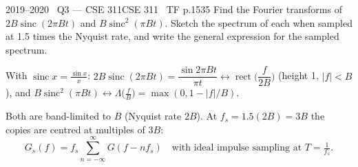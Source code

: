 \begin{qcard}{2019--2020 \textbullet\ Q3 --- CSE 311}{CSE 311 \textbullet\ TF p.15}{35}
Find the Fourier transforms of $2B\operatorname{sinc}(2\pi Bt)$ and $B\operatorname{sinc}^2(\pi Bt)$. Sketch the spectrum of each when sampled at 1.5 times the Nyquist rate, and write the general expression for the sampled spectrum.
\end{qcard}
\begin{solution}
With $\operatorname{sinc}x=\frac{\sin x}x$: $2B\operatorname{sinc}(2\pi Bt)=\dfrac{\sin2\pi Bt}{\pi t}\leftrightarrow\operatorname{rect}\Big(\dfrac f{2B}\Big)$ (height 1, $|f|<B$), and
$B\operatorname{sinc}^2(\pi Bt)\leftrightarrow\Lambda\big(\tfrac fB\big)=\max(0,1-|f|/B)$.

Both are band-limited to $B$ (Nyquist rate $2B$). At $f_s=1.5(2B)=3B$ the copies are centred at multiples of $3B$:
\[G_s(f)=f_s\sum_{n=-\infty}^{\infty}G(f-nf_s)\quad\text{with ideal impulse sampling at }T=\tfrac1{f_s}.\]
\begin{center}
\end{center}
\end{solution}

